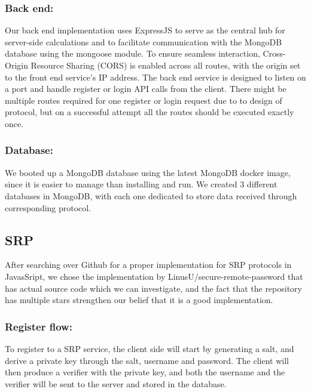 \subsubsection{Back end:}

Our back end implementation uses ExpressJS to serve as the central hub for server-side calculations and to facilitate communication with the MongoDB database using the mongoose module.
To ensure seamless interaction, Cross-Origin Resource Sharing (CORS) is enabled across all routes, with the origin set to the front end service's IP address. 
The back end service is designed to listen on a port and handle register or login API calls from the client. 
There might be multiple routes required for one register or login request due to to design of protocol, but on a successful attempt all the routes should be executed exactly once.

\subsubsection{Database:}
We booted up a MongoDB database using the latest MongoDB docker image, since it is easier to manage than installing and run. 
We created 3 different databases in MongoDB, with each one dedicated to store data received through corresponding protocol.

\subsection{SRP}
After searching over Github for a proper implementation for SRP protocols in JavasSript, we chose the implementation by LinusU/\newline secure-remote-password that has actual source code which we can investigate, and the fact that the repository has multiple stars strengthen our belief that it is a good implementation.~\cite{SRPrepo}

\subsubsection{Register flow:}
To register to a SRP service, the client side will start by generating a salt, and derive a private key through the salt, username and password.
The client will then produce a verifier with the private key, and both the username and the verifier will be sent to the server and stored in the database.


